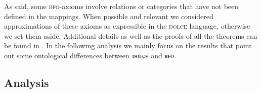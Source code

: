 \documentclass[ao]{iosart2x}
\newcommand{\nb}[1]{\textcolor{red}{$|$}\marginpar{\hspace*{-0cm}\parbox{20mm}{\scriptsize\raggedright\textcolor{red}{#1}}}}
\newcommand{\bfoDefLabel}{\textrm{d$_\texttt{b}$}}
\newcommand{\dbThrLabel}{\textrm{t$_\texttt{db}$}}
\newcommand{\refbfodf}[1]{({\bfoDefLabel}\ref{#1})}
\newcommand{\refdbth}[1]{({\dbThrLabel}\ref{#1})}
\newcommand{\cn}[1]{\mathtt{#1}}
\newcommand\textequal{%
 \rule[.08ex]{5pt}{0.35pt}\llap{\rule[.78ex]{5pt}{0.35pt}}}
\newcommand{\sdef}{{\hspace{1.5pt}:\hspace{-2.5pt}\textequal\hspace{3pt}}}
\newcommand{\dolce}{{\textsc{dolce}}}
\newcommand{\bfo}{{\textsc{bfo}}}
\newcommand {\thdolce} {\ensuremath{\mathfrak{D}}}
\newcommand {\thdolcedbmap} {\ensuremath{\mathfrak{D}_\texttt{b}}}
\newcommand{\bfoiof}[1]{{\,::_{#1\:\!}}}
\begin{document}

As said, %
some {\bfo}-axioms involve relations or categories that have not been defined in the mappings. When possible and relevant we considered approximations of these axioms as expressible in the {\dolce} language, otherwise we set them aside. Additional details as well as the proofs of all the theorems can be found in \citep{D24}. In the following analysis we mainly focus on the results that point out some ontological differences between $\dolce$ and $\bfo$. 




\subsection{Analysis}\label{sect_analysis_d2b}
\end{document}

